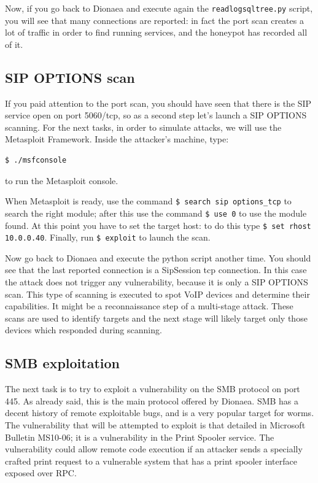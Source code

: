 \documentclass[epsfig,a4paper,11pt,titlepage,oneside,openany]{book}
\begin{document}
\begin{itemize}
Now, if you go back to Dionaea and execute again the \texttt{readlogsqltree.py} script, you will see that many connections are reported: in fact the port scan creates a lot of traffic in order to find running services, and the honeypot has recorded all of it.

\subsection{SIP OPTIONS scan}

If you paid attention to the port scan, you should have seen that there is the SIP service open on port 5060/tcp, so as a second step let’s launch a SIP OPTIONS scanning. For the next tasks, in order to simulate attacks, we will use the Metasploit Framework. Inside the attacker’s machine, type:
\begin{lstlisting}[language=bash]
$ ./msfconsole
\end{lstlisting}
to run the Metasploit console.

When Metasploit is ready, use the command \texttt{\$ search sip options\_tcp} to search the right module; after this use the command \texttt{\$ use 0} to use the module found. At this point you have to set the target host: to do this type \texttt{\$ set rhost 10.0.0.40}. Finally, run \texttt{\$ exploit} to launch the scan.

Now go back to Dionaea and execute the python script another time. You should see that the last reported connection is a SipSession tcp connection. In this case the attack does not trigger any vulnerability, because it is only a SIP OPTIONS scan. This type of scanning is executed to spot VoIP devices and determine their capabilities. It might be a reconnaissance step of a multi-stage attack. These scans are used to identify targets and the next stage will likely target only those devices which responded during scanning. \cite{ENISA}

\subsection{SMB exploitation}

The next task is to try to exploit a vulnerability on the SMB protocol on port 445. As already said, this is the main protocol offered by Dionaea. SMB has a decent history of remote exploitable bugs, and is a very popular target for worms. The vulnerability that will be attempted to exploit is that detailed in Microsoft Bulletin MS10-06; it is a vulnerability in the Print Spooler service. The vulnerability could allow remote code execution if an attacker sends a specially crafted print request to a vulnerable system that has a print spooler interface exposed over RPC.


\end{itemize}
\end{document}
